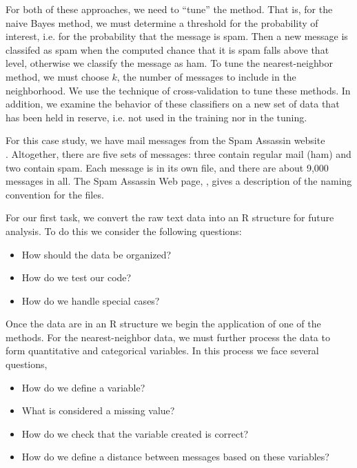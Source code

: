 For both of these approaches, we need to ``tune'' the method.
That is, for the naive Bayes method, we must determine a threshold 
for the probability of interest, i.e. for the probability that the message
is spam.
Then a new message is classifed
as spam when the computed chance that it is spam falls above that level, 
otherwise we classify the message as ham.  
To tune the nearest-neighbor method, we must choose $k$, the number of
messages to include in the neighborhood. 
We use the technique of cross-validation to tune these methods.
In addition, we examine the behavior of these classifiers on
a new set of data that has been held in reserve, i.e. not used in the 
training nor in the tuning.

For this case study, we have mail messages from the Spam Assassin website 
\\
.
Altogether, there are five sets of messages: three contain regular
mail (ham) and two contain spam.  Each message is in its own file, and
there are about 9,000 messages in all.  The Spam Assassin Web page,
,
gives a description of the naming convention for the files.

For our first task, we convert the raw text data into an R structure for 
future analysis. 
To do this we consider the following questions:

\begin{itemize}
  \item How should the data be organized?
  \item How do we test our code?
  \item How do we handle special cases?
\end{itemize}

Once the data are in an R structure we begin the application of 
one of the methods. 
For the nearest-neighbor data, we must further process the data
to form quantitative and categorical variables. 
In this process we face several questions,

\begin{itemize}
   \item How do we define a variable?
   \item What is considered a missing value?
   \item How do we check that the variable created is correct?
   \item How do we define a distance between messages based on these variables?
\end{itemize}

